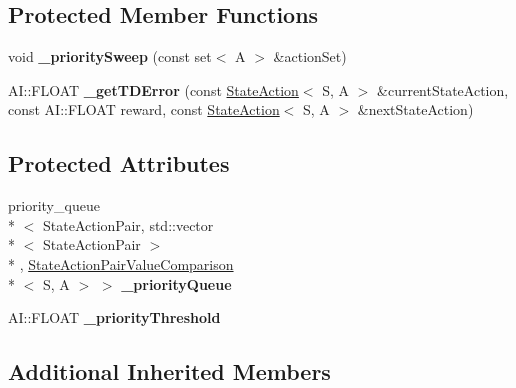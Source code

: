 \subsection*{Protected Member Functions}
\begin{DoxyCompactItemize}
\item 
\hypertarget{classAI_1_1Algorithm_1_1DynaQPrioritizeSweeping_a328421d2cc8ad26641b7786a5ca8b640}{void {\bfseries \-\_\-priority\-Sweep} (const set$<$ A $>$ \&action\-Set)}\label{classAI_1_1Algorithm_1_1DynaQPrioritizeSweeping_a328421d2cc8ad26641b7786a5ca8b640}

\item 
\hypertarget{classAI_1_1Algorithm_1_1DynaQPrioritizeSweeping_a9f69f4ed43b2d9bdb446241fffbb20d7}{A\-I\-::\-F\-L\-O\-A\-T {\bfseries \-\_\-get\-T\-D\-Error} (const \hyperlink{classAI_1_1StateAction}{State\-Action}$<$ S, A $>$ \&current\-State\-Action, const A\-I\-::\-F\-L\-O\-A\-T reward, const \hyperlink{classAI_1_1StateAction}{State\-Action}$<$ S, A $>$ \&next\-State\-Action)}\label{classAI_1_1Algorithm_1_1DynaQPrioritizeSweeping_a9f69f4ed43b2d9bdb446241fffbb20d7}

\end{DoxyCompactItemize}
\subsection*{Protected Attributes}
\begin{DoxyCompactItemize}
\item 
\hypertarget{classAI_1_1Algorithm_1_1DynaQPrioritizeSweeping_aceb5ef5c47db0d322b4e03ec2c457d1a}{priority\-\_\-queue\\*
$<$ State\-Action\-Pair, std\-::vector\\*
$<$ State\-Action\-Pair $>$\\*
, \hyperlink{classAI_1_1StateActionPairValueComparison}{State\-Action\-Pair\-Value\-Comparison}\\*
$<$ S, A $>$ $>$ {\bfseries \-\_\-priority\-Queue}}\label{classAI_1_1Algorithm_1_1DynaQPrioritizeSweeping_aceb5ef5c47db0d322b4e03ec2c457d1a}

\item 
\hypertarget{classAI_1_1Algorithm_1_1DynaQPrioritizeSweeping_adc3809217aba2de41fbea2b9fb9e5648}{A\-I\-::\-F\-L\-O\-A\-T {\bfseries \-\_\-priority\-Threshold}}\label{classAI_1_1Algorithm_1_1DynaQPrioritizeSweeping_adc3809217aba2de41fbea2b9fb9e5648}

\end{DoxyCompactItemize}
\subsection*{Additional Inherited Members}


